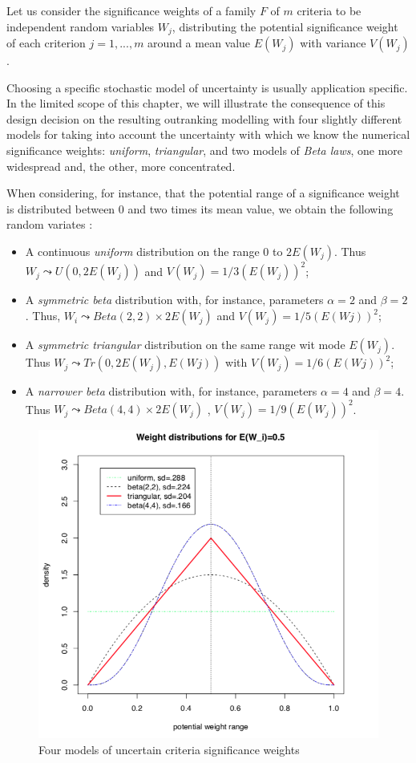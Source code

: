 Let us consider the significance weights of a family $F$ of $m$ criteria to be independent random variables $W_j$, distributing the potential significance weight of each criterion $j = 1, ..., m$ around a mean value $E(W_j)$ with variance $V(W_j)$.

Choosing a specific stochastic model of uncertainty is usually application specific. In the limited scope of this chapter, we will illustrate the consequence of this design decision on the resulting outranking modelling with four slightly different models for taking into account the uncertainty with which we know the numerical significance weights: \emph{uniform}, \emph{triangular}, and two models of \emph{Beta laws}, one more widespread and, the other, more concentrated.

When considering, for instance, that the potential range of a significance weight is distributed between $0$ and two times its mean value, we obtain the following random variates \citep{CPSTAT-L3}:
\begin{itemize}[topsep=2pt]
\item A continuous \emph{uniform} distribution on the range $0$ to $2E(W_j)$. Thus $W_j \leadsto U(0, 2E(W_j))$ and $V(W_j) = 1/3(E(W_j))^2$;
\item A \emph{symmetric beta} distribution with, for instance, parameters  $\alpha = 2$ and $\beta = 2$. Thus, $W_i \leadsto Beta(2,2) \times 2E(W_j)$ and $V(W_j) = 1/5(E(Wj))^2$;
\item A \emph{symmetric triangular} distribution on the same range wit mode $E(W_j)$. Thus $W_j \leadsto Tr(0, 2E(W_j), E(Wj))$ with $V(W_j) = 1/6(E(Wj))^2$;
\item A \emph{narrower beta} distribution with, for instance, parameters $\alpha = 4$ and $\beta = 4$. Thus $W_j \leadsto Beta(4,4) \times 2E(W_j)$ , $V(W_j) = 1/9(E(W_j))^2$.
\end{itemize}
\begin{figure}[ht]
\includegraphics[width=\hsize]{Figures/18-1-weightDistributions.png}
\caption{Four models of uncertain criteria significance weights}
\label{fig:18.1}       %
\end{figure}

